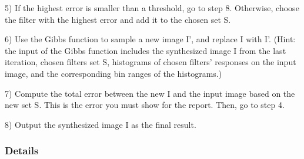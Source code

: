 \documentclass[11pt]{article}
\begin{document}
5) If the highest error is smaller than a threshold, go to step 8. Otherwise, choose the filter with the highest error and add it to the chosen set S.

6) Use the Gibbs function to sample a new image I', and replace I with I'. (Hint: the input of the Gibbs function includes the synthesized image I from the last iteration, chosen filters set S, histograms of chosen filters' responses on the input image, and the corresponding bin ranges of the histograms.)

7) Compute the total error between the new I and the input image based on the new set S. This is the error you must show for the report. Then, go to step 4.

8) Output the synthesized image I as the final result.

\subsubsection{Details}
\end{document}
